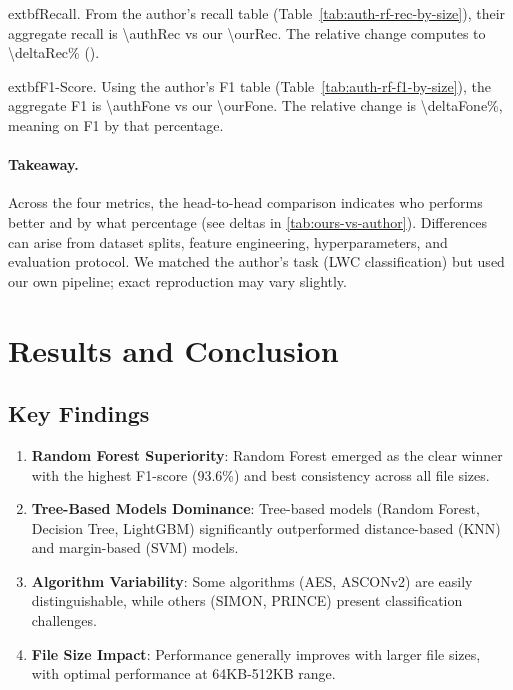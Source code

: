 \documentclass[12pt]{article}
\begin{document}
	extbf{Recall.} From the author's recall table (Table~\ref{tab:auth-rf-rec-by-size}), their aggregate recall is \num{\authRec} vs our \num{\ourRec}. The relative change computes to \num{\deltaRec}\% (\textbf{\ifdim\deltaRec pt>0pt ours better\else author better\fi}).

	extbf{F1-Score.} Using the author's F1 table (Table~\ref{tab:auth-rf-f1-by-size}), the aggregate F1 is \num{\authFone} vs our \num{\ourFone}. The relative change is \num{\deltaFone}\%, meaning \textbf{\ifdim\deltaFone pt>0pt ours is better\else the author is better\fi} on F1 by that percentage.

\paragraph{Takeaway.} Across the four metrics, the head-to-head comparison indicates who performs better and by what percentage (see deltas in \autoref{tab:ours-vs-author}). Differences can arise from dataset splits, feature engineering, hyperparameters, and evaluation protocol. We matched the author's task (LWC classification) but used our own pipeline; exact reproduction may vary slightly.

\section{Results and Conclusion}

\subsection{Key Findings}

\begin{enumerate}
    \item \textbf{Random Forest Superiority}: Random Forest emerged as the clear winner with the highest F1-score (93.6\%) and best consistency across all file sizes.
    
    \item \textbf{Tree-Based Models Dominance}: Tree-based models (Random Forest, Decision Tree, LightGBM) significantly outperformed distance-based (KNN) and margin-based (SVM) models.
    
    \item \textbf{Algorithm Variability}: Some algorithms (AES, ASCONv2) are easily distinguishable, while others (SIMON, PRINCE) present classification challenges.
    
    \item \textbf{File Size Impact}: Performance generally improves with larger file sizes, with optimal performance at 64KB-512KB range.
\end{enumerate}
\end{document}
